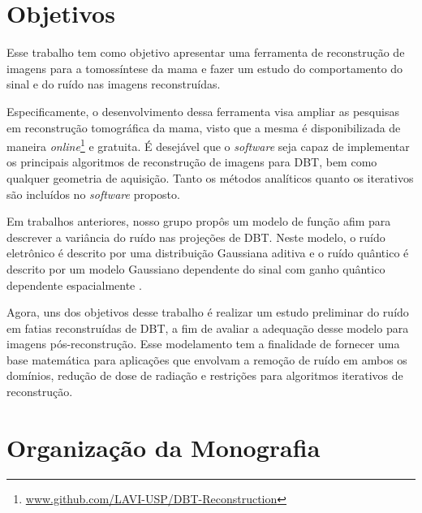 
\section{Objetivos}

Esse trabalho tem como objetivo apresentar uma ferramenta de reconstrução de imagens para a tomossíntese da mama e fazer um estudo do comportamento do sinal e do ruído nas imagens reconstruídas.

Especificamente, o desenvolvimento dessa ferramenta visa ampliar as pesquisas em reconstrução tomográfica da mama, visto que a mesma é disponibilizada de maneira \textit{online}\footnote{\url{www.github.com/LAVI-USP/DBT-Reconstruction}} e gratuita. É desejável que o \textit{software} seja capaz de implementar os principais algoritmos de reconstrução de imagens para \acs{DBT}, bem como qualquer geometria de aquisição. Tanto os métodos analíticos quanto os iterativos são incluídos no \textit{software} proposto.

Em trabalhos anteriores, nosso grupo propôs um modelo de função afim para descrever a variância do ruído nas projeções de \acs{DBT}. Neste modelo, o ruído eletrônico é descrito por uma distribuição Gaussiana aditiva e o ruído quântico é descrito por um modelo Gaussiano dependente do sinal com ganho quântico dependente espacialmente \cite{borges2017method,borges2018restoration}. 

Agora, uns dos objetivos desse trabalho é realizar um estudo preliminar do ruído em fatias reconstruídas de \acs{DBT}, a fim de avaliar a adequação desse modelo para imagens pós-reconstrução. Esse modelamento tem a finalidade de fornecer uma base matemática para aplicações que envolvam a remoção de ruído em ambos os domínios, redução de dose de radiação e restrições para algoritmos iterativos de reconstrução.


\section{Organização da Monografia}

